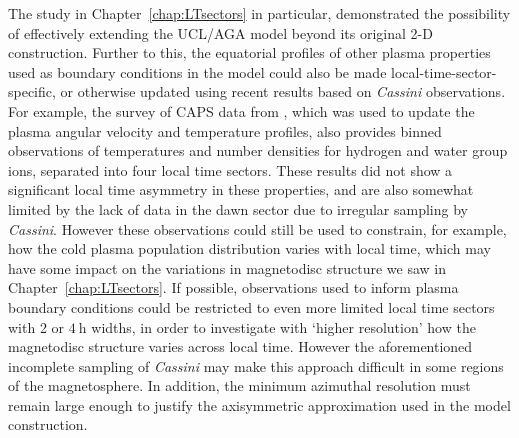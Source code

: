 The study in Chapter~\ref{chap:LTsectors} in particular, demonstrated the possibility of effectively extending the UCL/AGA model beyond its original 2-D construction. Further to this, the equatorial profiles of other plasma properties used as boundary conditions in the model could also be made local-time-sector-specific, or otherwise updated using recent results based on \textit{Cassini} observations. For example, the survey of CAPS data from \citet{wilson2017}, which was used to update the plasma angular velocity and temperature profiles, also provides binned observations of temperatures and number densities for hydrogen and water group ions, separated into four local time sectors. These results did not show a significant local time asymmetry in these properties, and are also somewhat limited by the lack of data in the dawn sector due to irregular sampling by \textit{Cassini}. However these observations could still be used to constrain, for example, how the cold plasma population distribution varies with local time, which may have some impact on the variations in magnetodisc structure we saw in Chapter~\ref{chap:LTsectors}. If possible, observations used to inform plasma boundary conditions could be restricted to even more limited local time sectors with 2 or $\SI{4}{\hour}$ widths, in order to investigate with `higher resolution' how the magnetodisc structure varies across local time. However the aforementioned incomplete sampling of \textit{Cassini} may make this approach difficult in some regions of the magnetosphere. In addition, the minimum azimuthal resolution must remain large enough to justify the axisymmetric approximation used in the model construction.

